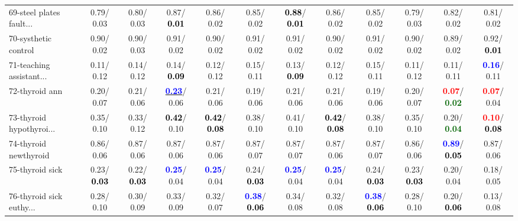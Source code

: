 \begin{table}[h]
\begin{center}
{\begin{tabular}{lc|c|c|c|c|c|c|c|c|c|c}
69-steel plates fault... &   0.79/  0.03 &   0.80/  0.03 &   0.87/\textcolor{black}{\textbf{  0.01}} &   0.86/  0.02 &   0.85/  0.02 & \textcolor{black}{\textbf{  0.88}}/\textcolor{black}{\textbf{  0.01}} &   0.86/  0.02 &   0.85/  0.02 &   0.79/  0.03 &   0.82/  0.02 &   0.81/  0.02 \\
70-systhetic control &   0.90/  0.02 &   0.90/  0.03 &   0.91/  0.02 &   0.90/  0.02 &   0.91/  0.02 &   0.91/  0.02 &   0.90/  0.02 &   0.91/  0.02 &   0.90/  0.02 &   0.89/  0.02 &   0.92/\textcolor{black}{\textbf{  0.01}} \\
71-teaching assistant... &   0.11/  0.12 &   0.14/  0.12 &   0.14/\textcolor{black}{\textbf{  0.09}} &   0.12/  0.12 &   0.15/  0.11 &   0.13/\textcolor{black}{\textbf{  0.09}} &   0.12/  0.12 &   0.15/  0.11 &   0.11/  0.12 &   0.11/  0.11 & \textcolor{blue}{\textbf{  0.16}}/  0.11 \\ \hline
72-thyroid ann &   0.20/  0.07 &   0.21/  0.06 & \underline{\textcolor{blue}{\textbf{  0.23}}}/  0.06 &   0.21/  0.06 &   0.19/  0.06 &   0.21/  0.06 &   0.21/  0.06 &   0.19/  0.06 &   0.20/  0.07 & \textcolor{red}{\textbf{  0.07}}/\textcolor{darkgreen}{\textbf{  0.02}} & \textcolor{red}{\textbf{  0.07}}/  0.04 \\
73-thyroid hypothyroi... &   0.35/  0.10 &   0.33/  0.12 & \textcolor{black}{\textbf{  0.42}}/  0.10 & \textcolor{black}{\textbf{  0.42}}/\textcolor{black}{\textbf{  0.08}} &   0.38/  0.10 &   0.41/  0.10 & \textcolor{black}{\textbf{  0.42}}/\textcolor{black}{\textbf{  0.08}} &   0.38/  0.10 &   0.35/  0.10 &   0.20/\textcolor{darkgreen}{\textbf{  0.04}} & \textcolor{red}{\textbf{  0.10}}/\textcolor{black}{\textbf{  0.08}} \\
74-thyroid newthyroid &   0.86/  0.06 &   0.87/  0.06 &   0.87/  0.06 &   0.87/  0.06 &   0.87/  0.07 &   0.87/  0.07 &   0.87/  0.06 &   0.87/  0.07 &   0.86/  0.06 & \textcolor{blue}{\textbf{  0.89}}/\textcolor{black}{\textbf{  0.05}} &   0.87/  0.06 \\
75-thyroid sick &   0.23/\textcolor{black}{\textbf{  0.03}} &   0.22/\textcolor{black}{\textbf{  0.03}} & \textcolor{blue}{\textbf{  0.25}}/  0.04 & \textcolor{blue}{\textbf{  0.25}}/  0.04 &   0.24/\textcolor{black}{\textbf{  0.03}} & \textcolor{blue}{\textbf{  0.25}}/  0.04 & \textcolor{blue}{\textbf{  0.25}}/  0.04 &   0.24/\textcolor{black}{\textbf{  0.03}} &   0.23/\textcolor{black}{\textbf{  0.03}} &   0.20/  0.04 &   0.18/  0.05 \\
76-thyroid sick euthy... &   0.28/  0.10 &   0.30/  0.09 &   0.33/  0.09 &   0.32/  0.07 & \textcolor{blue}{\textbf{  0.38}}/\textcolor{black}{\textbf{  0.06}} &   0.34/  0.08 &   0.32/  0.08 & \textcolor{blue}{\textbf{  0.38}}/\textcolor{black}{\textbf{  0.06}} &   0.28/  0.10 &   0.20/\textcolor{black}{\textbf{  0.06}} &   0.13/  0.08 \\

\end{tabular}}
\end{center}
\end{table}
